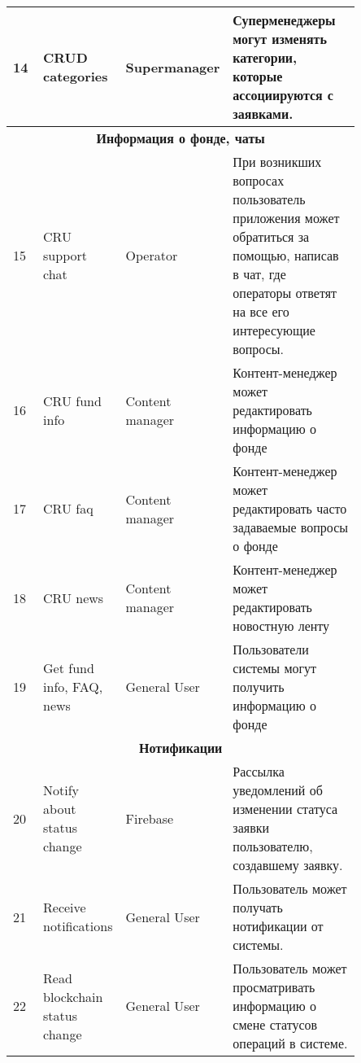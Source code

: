 \begin{center}
\begin{longtable}{|p{0.1\linewidth}|p{0.15\linewidth}|p{0.15\linewidth}|p{0.45\linewidth}|}
14 & CRUD categories & Supermanager & Суперменеджеры могут изменять категории, которые ассоциируются с заявками. \\ \hline

\multicolumn{4}{|c|}{\textbf{Информация о фонде, чаты}} \\ \hline

15 & CRU support chat & Operator & При возникших вопросах пользователь приложения может обратиться за помощью, написав в чат, где операторы ответят на все его интересующие вопросы. \\ \hline

16 & CRU fund info & Content manager & Контент-менеджер может редактировать информацию о фонде \\ \hline

17 & CRU faq & Content manager & Контент-менеджер может редактировать часто задаваемые вопросы о фонде \\ \hline

18 & CRU news & Content manager & Контент-менеджер может редактировать новостную ленту \\ \hline

19 & Get fund info, FAQ, news & General User & Пользователи системы могут получить информацию о фонде \\ \hline

\multicolumn{4}{|c|}{\textbf{Нотификации}} \\ \hline

20 & Notify about status change & Firebase & Рассылка уведомлений об изменении статуса заявки пользователю, создавшему заявку. \\ \hline

21 & Receive notifications & General User & Пользователь может получать нотификации от системы. \\ \hline

22 & Read blockchain status change & General User & Пользователь может просматривать информацию о смене статусов операций в системе. \\ 

\end{longtable}
\end{center}